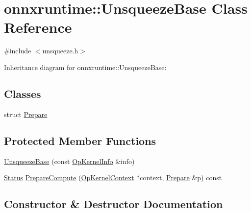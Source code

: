\hypertarget{classonnxruntime_1_1UnsqueezeBase}{}\section{onnxruntime\+:\+:Unsqueeze\+Base Class Reference}
\label{classonnxruntime_1_1UnsqueezeBase}


{\ttfamily \#include $<$unsqueeze.\+h$>$}



Inheritance diagram for onnxruntime\+:\+:Unsqueeze\+Base\+:
\subsection*{Classes}
\begin{DoxyCompactItemize}
\item 
struct \mbox{\hyperlink{structonnxruntime_1_1UnsqueezeBase_1_1Prepare}{Prepare}}
\end{DoxyCompactItemize}
\subsection*{Protected Member Functions}
\begin{DoxyCompactItemize}
\item 
\mbox{\hyperlink{classonnxruntime_1_1UnsqueezeBase_a4a4e94832f31ebf827412b5d21c82121}{Unsqueeze\+Base}} (const \mbox{\hyperlink{classonnxruntime_1_1OpKernelInfo}{Op\+Kernel\+Info}} \&info)
\item 
\mbox{\hyperlink{classonnxruntime_1_1common_1_1Status}{Status}} \mbox{\hyperlink{classonnxruntime_1_1UnsqueezeBase_a36e6bc9ed11b67f57f26c681dabf3c5b}{Prepare\+Compute}} (\mbox{\hyperlink{classonnxruntime_1_1OpKernelContext}{Op\+Kernel\+Context}} $\ast$context, \mbox{\hyperlink{structonnxruntime_1_1UnsqueezeBase_1_1Prepare}{Prepare}} \&p) const
\end{DoxyCompactItemize}


\subsection{Constructor \& Destructor Documentation}
\mbox{\label{classonnxruntime_1_1UnsqueezeBase_a4a4e94832f31ebf827412b5d21c82121}} 
